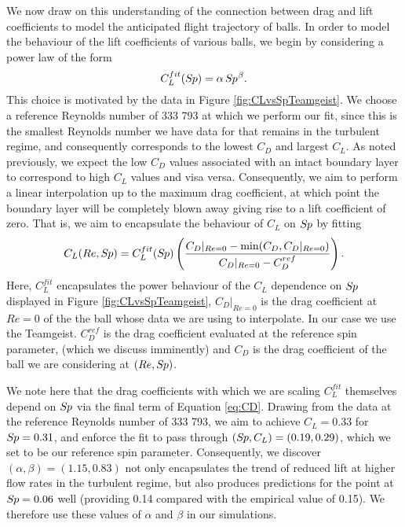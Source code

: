 \documentclass[a4paper]{article}
\begin{document}
We now draw on this understanding of the connection between drag and lift coefficients to model the anticipated flight trajectory of balls.  In order to model the behaviour of the lift coefficients of various balls, we begin by considering a power law of the form 
%
\begin{equation}
C_{L}^{fit}(S\!{\kern 0.125em}p) = \alpha\,{S\!{\kern 0.125em}p}{\kern 0.05em}^{\beta}.
\end{equation}
%
This choice is motivated by the data in Figure \ref{fig:CLvsSpTeamgeist}.  We choose a reference Reynolds number of 333 793 at which we perform our fit, since this is the smallest Reynolds number we have data for that remains in the turbulent regime, and consequently corresponds to the lowest $C_{D}$ and largest $C_{L}$.  As noted previously, we expect the low $C_{D}$ values associated with an intact boundary layer to correspond to high $C_{L}$ values and visa versa.  Consequently, we aim to perform a linear interpolation up to the maximum drag coefficient, at which point the boundary layer will be completely blown away giving rise to a lift coefficient of zero.  That is, we aim to encapsulate the behaviour of $C_{L}$ on $S\!{\kern 0.125em}p$ by fitting
%
\begin{equation}\label{eq:CLPrediction}
C_L(Re, S\!{\kern 0.125em}p) = C_{L}^{fit}(S\!{\kern 0.125em}p)\left(\frac{C_{D}|_{Re = 0} - \min(C_{D}, C_{D}|_{Re = 0})}{C_{D}|_{Re = 0} - C_{D}^{ref}}\right).
\end{equation} 
%
Here, $C_{L}^{fit}$ encapsulates the power behaviour of the $C_{L}$ dependence on $S\!{\kern 0.125em}p$ displayed in Figure \ref{fig:CLvsSpTeamgeist}, $C_{D}|_{Re = 0}$ is the drag coefficient at $Re = 0$ of the the ball whose data we are using to interpolate.  In our case we use the Teamgeist.  $C_{D}^{ref}$ is the drag coefficient evaluated at the reference spin parameter, (which we discuss imminently) and $C_{D}$ is the drag coefficient of the ball we are considering at $(Re, S\!{\kern 0.125em}p)$. 

We note here that the drag coefficients with which we are scaling $C_{L}^{fit}$ themselves depend on $S\!{\kern 0.125em}p$ via the final term of Equation \ref{eq:CD}.  Drawing from the data at the reference Reynolds number of 333 793, we aim to achieve $C_{L} = 0.33$ for $S\!{\kern 0.125em}p = 0.31$, and enforce the fit to pass through $(S\!{\kern 0.125em}p, C_{L}) = (0.19, 0.29)$, which we set to be our reference spin parameter.  Consequently, we discover $(\alpha, \beta) = (1.15, 0.83)$ not only encapsulates the trend of reduced lift at higher flow rates in the turbulent regime, but also produces predictions for the point at $S\!{\kern 0.125em}p = 0.06$ well (providing 0.14 compared with the empirical value of 0.15).  We therefore use these values of $\alpha$ and $\beta$ in our simulations.  
\end{document}
